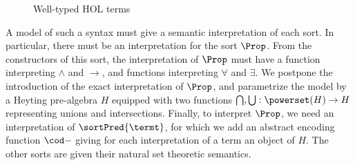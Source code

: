 \begin{figure}[t]
\begin{center}
  \vspace{0.2cm}
  \quad

  \vspace{0.2cm}
  \quad%

  \vspace{0.2cm}
  \end{center}
   \label{fig:hol_terms}
   \caption{Well-typed HOL terms}   %
  \end{figure}

A model of such a syntax must give a semantic interpretation of each sort. In particular, there must be an interpretation for the sort $\Prop$. From the constructors of this sort, the interpretation of $\Prop$ must have a function interpreting $\land$ and $\to$, and functions interpreting $\forall$ and $\exists$. We postpone the introduction of the exact interpretation of $\Prop$, and parametrize the model by a Heyting pre-algebra $H$ equipped with two functions $\bigcap,\bigcup : \powerset (H) \to H$ representing unions and intersections. Finally, to interpret $\Prop$, we need an interpretation of $\sortPred{\termt}$, for which we add an abstract encoding function $\cod -$ giving for each interpretation of a term an object of $H$.
The other sorts are given their natural set theoretic semantics.

